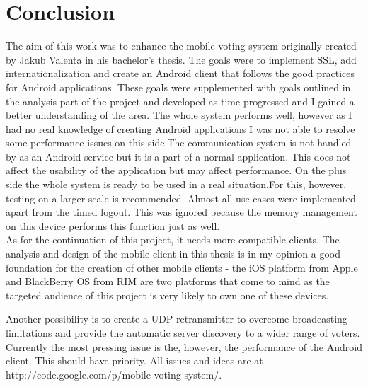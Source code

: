 \documentclass[11pt,twoside,a4paper]{book}
\begin{document}
\chapter{Conclusion}
The aim of this work was to enhance the mobile voting system originally  created by Jakub Valenta in his bachelor's thesis. The goals were to implement SSL, add internationalization and create an Android client that follows the good practices for Android applications. These goals were supplemented with goals outlined in the analysis part of the project and developed as time progressed and I gained a better understanding of the area. The whole system performs well, however as I had no real knowledge of creating Android applications I was not able to resolve some performance issues on this side.The communication system is not handled by as an Android service but it is a part of a normal application. This does not affect the usability of the application but may affect performance. On the plus side the whole system is ready to be used in a real situation.For this, however, testing on a larger scale is recommended. Almost all use cases were implemented apart from the timed logout. This was ignored because the memory management on this device performs this function just as well.\\



As for the continuation of this project, it needs more compatible clients. The analysis and design of the mobile client in this thesis is in my opinion a good foundation for the creation of other mobile clients - the iOS platform from Apple and BlackBerry OS from RIM are two platforms that come to mind as the targeted audience of this project is very likely to own one of these devices.  

Another possibility is to create a UDP retransmitter to overcome broadcasting limitations and provide the automatic server discovery to a wider range of voters. Currently the most pressing issue is the, however, the performance of the Android client. This should have priority. All issues and ideas are at \\ http://code.google.com/p/mobile-voting-system/.




{
\def\CS{$\cal C\kern-0.1667em\lower.5ex\hbox{$\cal S$}\kern-0.075em $}

}
\end{document}
